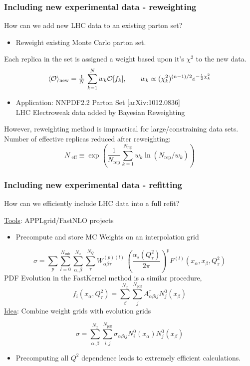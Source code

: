 \documentclass[10pt]{beamer}
\newcommand{\be}{\begin{equation*}}
\newcommand{\ee}{\end{equation*}}
\def\smallfrac#1#2{\hbox{${{#1}\over {#2}}$}}
\begin{document}
\begin{frame}
\frametitle{Including new experimental data - reweighting}
How can we add new LHC data to an existing parton set?

\begin{itemize}
		\item<1->Reweight existing Monte Carlo parton set.\\
\end{itemize}
Each replica in the set is assigned a weight based upon it's $\chi^2$ to the new data.
\be \langle\mathcal{O}\rangle_{\mathrm {new}}=\smallfrac{1}{N}\,\sum_{k=1}^{N}w_k\mathcal{O}[f_k], \quad\quad w_k \propto
(\chi^{2}_k)^{(n-1)/2}
e^{-\frac{1}{2}\chi^{2}_k}  \ee
\begin{itemize}
		\item<1-> Application: NNPDF2.2 Parton Set   \hfill {\color{blue} [arXiv:1012.0836]}\\
		LHC Electroweak data added by Bayesian Reweighting
\end{itemize}
\vskip10pt

However, reweighting method is impractical for large/constraining data sets.
 Number of effective replicas reduced after reweighting: \be N_{\textrm{ eff}} \equiv \exp \left(\frac{1}{N_{\mathrm{rep}}}\sum_{k=1}^{N_{\mathrm{rep}}}w_k\ln(N_{\mathrm{rep}}/w_k)\right)\ee

\end{frame}


\begin{frame}
\frametitle{Including new experimental data - refitting}
How can we efficiently include LHC data into a full refit?

\underline{Tools}: APPLgrid/FastNLO projects

\begin{itemize}
\item<1-> Precompute and store MC Weights on an interpolation grid
\end{itemize}
\begin{equation}
\label{eq:applconv}
\sigma = \sum_p \sum_{l=0}^{N_{\mathrm{sub}}} \sum_{\alpha,\beta}^{N_x} \sum_{\tau}^{N_{Q}}
W_{\alpha\beta\tau}^{(p)(l)} \, \left( \frac{\alpha_s\left(Q^2_{\tau}\right)}{2\pi}\right)^{p}
F^{(l)}\left(x_{\alpha}, x_{\beta},  Q^2_{\tau}\right)
\end{equation}
PDF Evolution in the FastKernel method is a similar procedure,
\be f_i(x_{\alpha},Q^2_\tau) =  \sum_\beta^{N_{x}} \sum_{j}^{N_{\mathrm{pdf}}} A^{\tau}_{\alpha\beta ij}N^0_j(x_{\beta} )\ee
\underline{Idea}: Combine weight grids with evolution grids

  \be \sigma= \sum_{\alpha,\beta}^{N_x}\sum_{i,j}^{N_{\mathrm{pdf}}} \sigma_{\alpha\beta i j}N_i^0(x_\alpha)N_j^0(x_\beta)\ee
 \begin{itemize}
\item<1-> Precomputing all $Q^2$ dependence leads to extremely efficient calculations.
\end{itemize}\end{frame}
\end{document}
